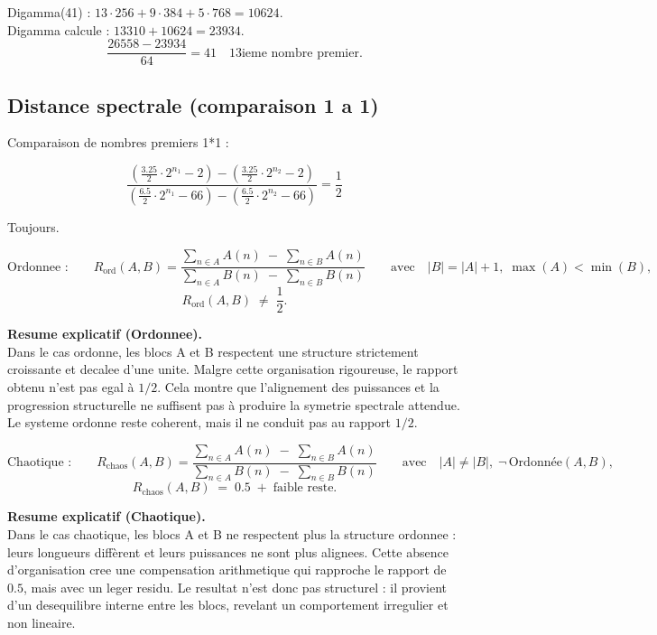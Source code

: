 \documentclass[a4paper,11pt]{article}
\begin{document}
Digamma(41) : \(13 \cdot 256 + 9 \cdot 384 + 5 \cdot 768 = 10624\).\\
Digamma calcule : \(13310 + 10624 = 23934\).\\

\[
\frac{26558 - 23934}{64} = 41 \quad \text{13ieme nombre premier.}
\]

\bigskip

\subsection*{Distance spectrale (comparaison 1 a 1)}

Comparaison de nombres premiers 1*1 :

\[
\frac{
\left(\frac{3.25}{2} \cdot 2^{n_{1}} - 2\right)
-
\left(\frac{3.25}{2} \cdot 2^{n_{2}} - 2\right)
}{
\left(\frac{6.5}{2} \cdot 2^{n_{1}} - 66\right)
-
\left(\frac{6.5}{2} \cdot 2^{n_{2}} - 66\right)
}
= \frac{1}{2}
\]

Toujours.

\[
\text{Ordonnee :}\qquad
R_{\mathrm{ord}}(A,B)
=
\frac{\displaystyle \sum_{n \in A} A(n)\;-\;\sum_{n \in B} A(n)}
     {\displaystyle \sum_{n \in A} B(n)\;-\;\sum_{n \in B} B(n)}
\qquad\text{avec}\quad |B| = |A| + 1,\; \max(A) < \min(B),
\]
\[
R_{\mathrm{ord}}(A,B) \;\neq\; \frac{1}{2}.
\]

\textbf{Resume explicatif (Ordonnee).} \\
Dans le cas ordonne, les blocs A et B respectent une structure strictement croissante
et decalee d'une unite. Malgre cette organisation rigoureuse, le rapport obtenu n'est
pas egal à $1/2$. Cela montre que l'alignement des puissances et la progression
structurelle ne suffisent pas à produire la symetrie spectrale attendue. Le systeme
ordonne reste coherent, mais il ne conduit pas au rapport $1/2$.

\[
\text{Chaotique :}\qquad
R_{\mathrm{chaos}}(A,B)
=
\frac{\displaystyle \sum_{n \in A} A(n)\;-\;\sum_{n \in B} A(n)}
     {\displaystyle \sum_{n \in A} B(n)\;-\;\sum_{n \in B} B(n)}
\qquad\text{avec}\quad |A| \neq |B|,\; \neg\,\text{Ordonnée}(A,B),
\]
\[
R_{\mathrm{chaos}}(A,B) \;=\; 0.5 \;+\; \text{faible reste}.
\]

\textbf{Resume explicatif (Chaotique).} \\
Dans le cas chaotique, les blocs A et B ne respectent plus la structure ordonnee :
leurs longueurs diffèrent et leurs puissances ne sont plus alignees. Cette absence
d'organisation cree une compensation arithmetique qui rapproche le rapport de $0.5$,
mais avec un leger residu. Le resultat n'est donc pas structurel : il provient d'un
desequilibre interne entre les blocs, revelant un comportement irregulier et non lineaire.
\end{document}

